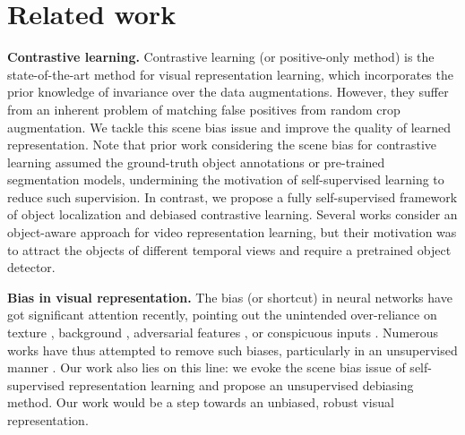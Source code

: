 \documentclass{article}
\begin{document}
\section{Related work}
\label{sec:related}


\textbf{Contrastive learning.}
Contrastive learning (or positive-only method) \citep{he2020momentum,chen2020simple,grill2020bootstrap} is the state-of-the-art method for visual representation learning, which incorporates the prior knowledge of invariance over the data augmentations. However, they suffer from an inherent problem of matching false positives from random crop augmentation. We tackle this scene bias issue and improve the quality of learned representation. Note that prior work considering the scene bias for contrastive learning \cite{purushwalkam2020demystifying,selvaraju2021casting,zhao2021distilling,ryali2021leveraging} assumed the ground-truth object annotations or pre-trained segmentation models, undermining the motivation of self-supervised learning to reduce such supervision. In contrast, we propose a fully self-supervised framework of object localization and debiased contrastive learning. Several works \citep{pirk2019online,romijnders2021representation} consider an object-aware approach for video representation learning, but their motivation was to attract the objects of different temporal views and require a pretrained object detector.

\textbf{Bias in visual representation.}
The bias (or shortcut) in neural networks \citep{geirhos2020shortcut} have got significant attention recently, pointing out the unintended over-reliance on texture \citep{geirhos2019imagenet}, background \citep{xiao2021noise}, adversarial features \citep{ilyas2019adversarial}, or conspicuous inputs \citep{moon2021masker}. Numerous works have thus attempted to remove such biases, particularly in an unsupervised manner \citep{wang2019learning,minderer2020automatic,nam2020learning}. Our work also lies on this line: we evoke the scene bias issue of self-supervised representation learning and propose an unsupervised debiasing method. Our work would be a step towards an unbiased, robust visual representation.
\end{document}
